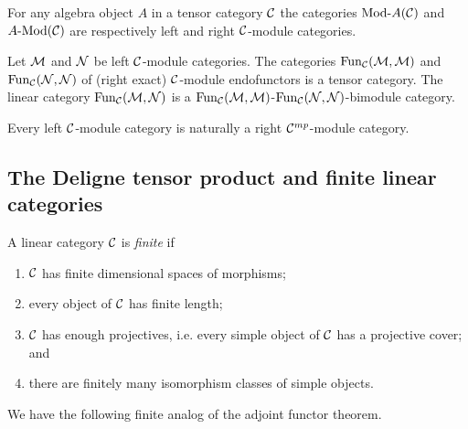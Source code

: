 \documentclass{amsart}
\begin{document}
\begin{example}
	For any algebra object $A$ in a tensor category $\mathcal C$ the categories $\Mod{}{A}(\cC)$ and $\Mod{A}{}(\cC)$ are respectively left and right $\mathcal C$-module categories. 
\end{example}

\begin{example}
	Let $\mathcal M$ and $\mathcal N$ be left $\mathcal C$-module categories. The categories $\operatorname{Fun}_{\mathcal C}(\mathcal M, \mathcal M)$ and $\operatorname{Fun}_{\mathcal C}(\mathcal N, \mathcal N)$ of (right exact) $\mathcal C$-module endofunctors is a tensor category. The linear category $\operatorname{Fun}_{\mathcal C}(\mathcal M, \mathcal N)$ is a $\operatorname{Fun}_{\mathcal C}(\mathcal M, \mathcal M)$-$\operatorname{Fun}_{\mathcal C}(\mathcal N, \mathcal N)$-bimodule category. 
\end{example}

\begin{remark}
 	Every left $\mathcal C$-module category is naturally a right $\mathcal C^{mp}$-module category. 
\end{remark}



\subsection{The Deligne tensor product and finite linear categories}

\begin{definition} %
	A linear category $\mathcal C$ is {\em finite} if 
	\begin{enumerate}
		\item $\mathcal C$ has finite dimensional spaces of morphisms;
		\item every object of $\mathcal C$ has finite length;
		\item $\mathcal C$ has enough projectives, i.e. every simple object of $\mathcal C$ has a projective cover; and
		\item there are finitely many isomorphism classes of simple objects.  
	\end{enumerate}
\end{definition}


We have the following finite analog of the adjoint functor theorem. 
\end{document}
